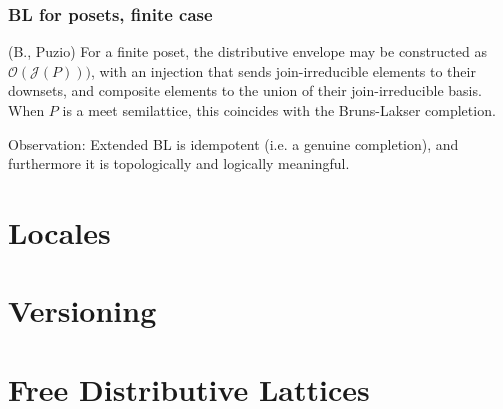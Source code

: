 \documentclass{beamer}
\newcommand{\Oc}{\mathcal{O}}
\newcommand{\Jc}{\mathcal{J}}
\begin{document}
\begin{frame}
\frametitle{BL for posets, finite case}

\begin{theorem}
(B., Puzio) For a finite poset, the distributive envelope may be constructed as \(\Oc(\Jc(P)))\), with an injection that sends join-irreducible elements to their downsets, and composite elements to the union of their join-irreducible basis. When \(P\) is a meet semilattice, this coincides with the Bruns-Lakser completion.
\end{theorem}

Observation: Extended BL is idempotent (i.e. a genuine completion), and furthermore it is topologically and logically meaningful.
\end{frame}


	\section{Locales}
	\section{Versioning}
	\section{Free Distributive Lattices}
	
\end{document}
